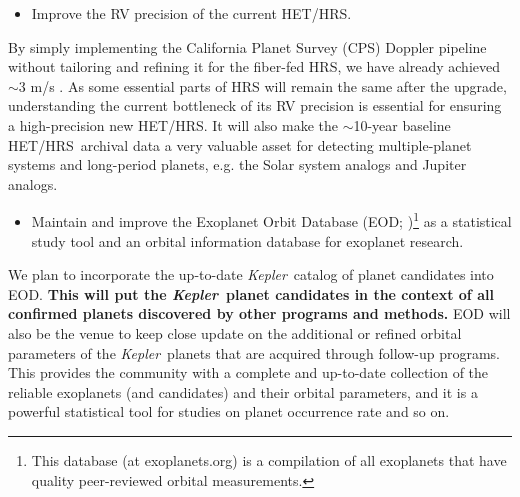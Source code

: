 \documentclass[12pt]{article}
\def\kepler{{\it Kepler}}
\def\hrs{HET/HRS}
\begin{document}
\begin{itemize}[leftmargin=2.2em]
  \vspace{-3pt}
\item Improve the RV precision of the current \hrs.
  \vspace{-3pt}
\end{itemize}
By simply implementing the California Planet Survey (CPS) Doppler
pipeline without tailoring and refining it for the fiber-fed HRS, we have
already achieved $\sim$3 m/s \citep{johnson2011,wang2011,wang2012}. As
some essential parts of HRS will remain the same after the upgrade,
understanding the current bottleneck of its RV precision is essential
for ensuring a high-precision new \hrs. It will also make the
$\sim$10-year baseline \hrs\ archival data a very valuable asset for 
detecting multiple-planet systems and long-period planets, e.g. the
Solar system analogs and Jupiter analogs.

\begin{itemize}[leftmargin=2.2em]
    \vspace{-3pt}
\item Maintain and improve the Exoplanet Orbit Database (EOD; 
\citealt{wright2011})\footnote{This database (at exoplanets.org) is a
  compilation of all exoplanets that have quality peer-reviewed
  orbital measurements.} as a statistical study tool and an orbital
information database for exoplanet research.
  \vspace{-3pt}
\end{itemize}
We plan to incorporate the up-to-date \kepler\ catalog of planet
candidates into EOD. \textbf{This will put the \kepler\ planet candidates in
the context of all confirmed planets discovered by other programs and
methods.} EOD will also be the venue to keep close update on the
additional or refined orbital parameters of the \kepler\ planets that
are acquired through follow-up programs. This provides the community
with a complete and up-to-date collection of the reliable exoplanets
(and candidates) and their orbital parameters, and it is a powerful 
statistical tool for studies on planet occurrence rate and so on.
\end{document}
